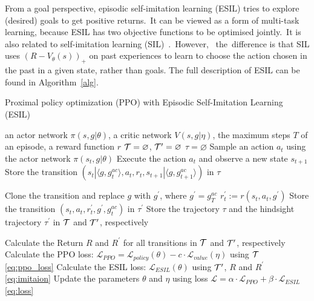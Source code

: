 From a goal perspective, episodic self-imitation learning (ESIL) tries to explore (desired) goals to get positive returns.~It can be viewed as a form of multi-task learning, {because ESIL has two objective functions to be optimised jointly.}~It is also related to self-imitation learning (SIL)~\cite{oh2018self}.~However,~ the~difference is that SIL uses $\left(R-V_{\theta}(s)\right)_{+}$ on past experiences to learn to choose the action chosen in the past in a given state, rather than goals. The full description of ESIL can be found in Algorithm~\ref{alg}.
\begin{algorithm}[t!]
  \caption{Proximal policy optimization (PPO) with Episodic Self-Imitation Learning (ESIL)}
  \label{alg}
  \begin{algorithmic}[1]
    \REQUIRE an actor network $\pi(s, g|\theta)$, a critic network $V(s, g|\eta)$, the maximum steps $T$ of an episode, a reward function $r$
    \STATE $\mathcal{T} = \varnothing$, $\mathcal{T}^{\prime} = \varnothing$ 
    \STATE $\tau = \varnothing$
    \STATE Sample an action $a_{t}$ using the actor network $\pi(s_{t}, g|\theta)$
    \STATE Execute the action $a_{t}$ and observe a new state $s_{t+1}$
    \STATE Store the transition $\left(s_{t}|\langle g, g^{ac}_{t} \rangle, a_{t}, r_{t}, s_{t+1}|\langle g, g^{ac}_{t+1} \rangle \right)$ in $\tau$
    \ENDFOR

    \STATE Clone the transition and replace $g$ with $g^{\prime}$, where $g^{\prime}=g^{ac}_{T}$
    \STATE $r_{t}^{\prime}:=r\left(s_{t}, a_{t}, g^{\prime}\right)$
    \STATE Store the transition $\left(s_{t}, a_{t}, r_{t}^{\prime}, g^{\prime}, g^{ac}_t\right)$ in $\tau^{\prime}$
    \ENDFOR
    \STATE Store the trajectory $\tau$ and the hindsight trajectory $\tau^{\prime}$ in $\mathcal{T}$ and $\mathcal{T}^{\prime}$, respectively 
    \ENDFOR

    \STATE Calculate the Return $R$ and $R^{\prime}$ for all transitions in $\mathcal{T}$ and $\mathcal{T}^{\prime}$, respectively
    \STATE Calculate the PPO loss: $\mathcal{L}_{PPO} = \mathcal{L}_{policy}(\theta) - c\cdot \mathcal{L}_{value}(\eta)$ using $\mathcal{T}$ \eqref{eq:ppo_loss}
    \STATE Calculate the ESIL loss: $\mathcal{L}_{ESIL}(\theta)$ using $\mathcal{T}^{\prime}$, $R$ and $R^{\prime}$ \eqref{eq:imitaion}
    \STATE Update the parameters $\theta$ and $\eta$ using loss $\mathcal{L}=\alpha\cdot\mathcal{L}_{PPO} + \beta\cdot\mathcal{L}_{ESIL}$ \eqref{eq:loss}
    \ENDFOR 
\end{algorithmic}
\end{algorithm}

